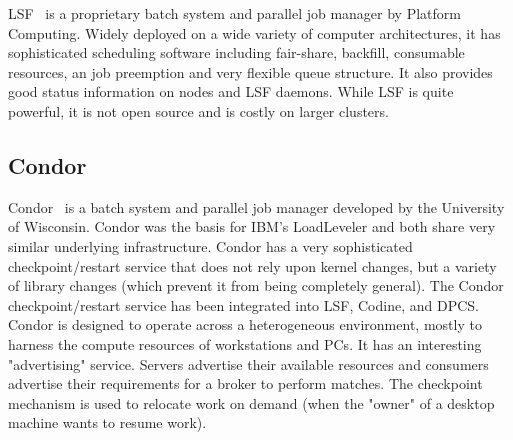 LSF~\cite{LSF}
is a proprietary batch system and parallel job manager by 
Platform Computing. Widely deployed on a wide variety of computer 
architectures, it has sophisticated scheduling software including 
fair-share, backfill, consumable resources, an job preemption and 
very flexible queue structure.
It also provides good status information on nodes and LSF daemons.
While LSF is quite powerful, it is not open source and is costly on 
larger clusters.
%


\subsection*{Condor}

Condor~\cite{Condor,Litzkow88,Basney97}
is a batch system and parallel job manager 
developed by the University of Wisconsin. 
Condor was the basis for IBM's LoadLeveler and both share very similar 
underlying infrastructure. Condor has a very sophisticated checkpoint/restart 
service that does not rely upon kernel changes, but a variety of 
library changes (which prevent it from being completely general). The 
Condor checkpoint/restart service has been integrated into LSF, 
Codine, and DPCS. Condor is designed to operate across a 
heterogeneous environment, mostly to harness the compute resources of 
workstations and PCs. It has an interesting "advertising" service. 
Servers advertise their available resources and consumers advertise 
their requirements for a broker to perform matches. The checkpoint 
mechanism is used to relocate work on demand (when the "owner" of a 
desktop machine wants to resume work).


